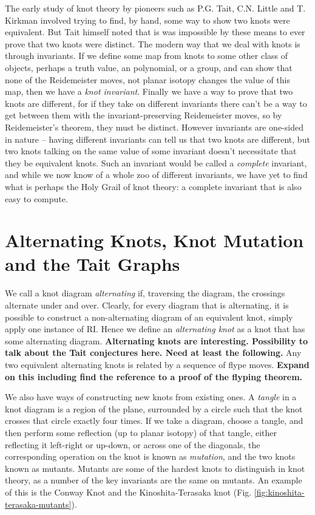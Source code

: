 \documentclass[12pt]{report}
\newcommand{\notered}[1]{{\color{Red} \textbf{#1}}}
\begin{document}
The early study of knot theory by pioneers such as P.G. Tait, C.N. Little and T. Kirkman involved trying to find, by hand, some way to show two knots were equivalent. But Tait himself noted that is was impossible by these means to ever prove that two knots were distinct. The modern way that we deal with knots is through invariants. If we define some map from knots to some other class of objects, perhaps a truth value, an polynomial, or a group, and can show that none of the Reidemeister moves, not planar isotopy changes the value of this map, then we have a \textit{knot invariant}. Finally we have a way to prove that two knots are different, for if they take on different invariants there can't be a way to get between them with the invariant-preserving Reidemeister moves, so by Reidemeister's theorem, they must be distinct. However invariants are one-sided in nature -- having different invariants can tell us that two knots are different, but two knots talking on the same value of some invariant doesn't necessitate that they be equivalent knots. Such an invariant would be called a \textit{complete} invariant, and while we now know of a whole zoo of different invariants, we have yet to find what is perhaps the Holy Grail of knot theory: a complete invariant that is also easy to compute.

\section{Alternating Knots, Knot Mutation and the Tait Graphs}
We call a knot diagram \textit{alternating} if, traversing the diagram, the crossings alternate under and over. Clearly, for every diagram that is alternating, it is possible to construct a non-alternating diagram of an equivalent knot, simply apply one instance of RI. Hence we define an \textit{alternating knot} as a knot that has some alternating diagram. \notered{Alternating knots are interesting. Possibility to talk about the Tait conjectures here. Need at least the following.} Any two equivalent alternating knots is related by a sequence of flype moves. \notered{Expand on this including find the reference to a proof of the flyping theorem.}

We also have ways of constructing new knots from existing ones. A \textit{tangle} in a knot diagram is a region of the plane, surrounded by a circle such that the knot crosses that circle exactly four times. If we take a diagram, choose a tangle, and then perform some reflection (up to planar isotopy) of that tangle, either reflecting it left-right or up-down, or across one of the diagonals, the corresponding operation on the knot is known as \textit{mutation}, and the two knots known as mutants. Mutants are some of the hardest knots to distinguish in knot theory, as a number of the key invariants are the same on mutants. An example of this is the Conway Knot and the Kinoshita-Terasaka knot (Fig. \ref{fig:kinoshita-terasaka-mutants}).
\end{document}
